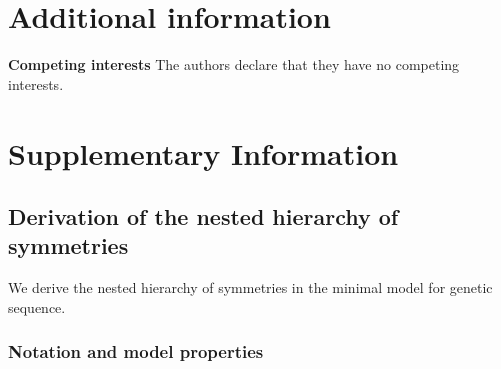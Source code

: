 \documentclass[fleqn,10pt]{wlscirep}
\begin{document}
\section*{Additional information}

 \textbf{Competing interests}  The authors declare that they have no competing interests. 







\newpage
\section*{Supplementary Information}
\subsection*{Derivation of the nested hierarchy of symmetries}\label{sec.hierarchy}
We  derive  the nested hierarchy of symmetries in the minimal model for genetic sequence.

\subsubsection*{Notation and model properties}
\end{document}

